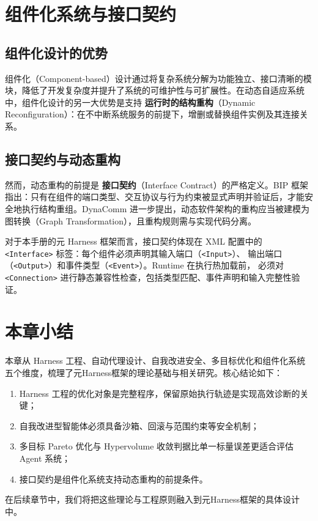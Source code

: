 \section{组件化系统与接口契约}

\subsection{组件化设计的优势}

组件化（Component-based）设计通过将复杂系统分解为功能独立、接口清晰的模块，降低了开发复杂度并提升了系统的可维护性与可扩展性。在动态自适应系统中，组件化设计的另一大优势是支持 \textbf{运行时的结构重构}（Dynamic Reconfiguration）：在不中断系统服务的前提下，增删或替换组件实例及其连接关系。

\subsection{接口契约与动态重构}

然而，动态重构的前提是 \textbf{接口契约}（Interface Contract）的严格定义。BIP 框架 \cite{bip2011} 指出：只有在组件的端口类型、交互协议与行为约束被显式声明并验证后，才能安全地执行结构重组。DynaComm \cite{dynacomm2007} 进一步提出，动态软件架构的重构应当被建模为图转换（Graph Transformation），且重构规则需与实现代码分离。

对于本手册的元 Harness 框架而言，接口契约体现在 XML 配置中的
\texttt{<Interface>} 标签：每个组件必须声明其输入端口（\texttt{<Input>}）、
输出端口（\texttt{<Output>}）和事件类型（\texttt{<Event>}）。Runtime 在执行热加载前，
必须对 \texttt{<Connection>} 进行静态兼容性检查，包括类型匹配、事件声明和输入完整性验证。

\section{本章小结}

本章从 Harness 工程、自动代理设计、自我改进安全、多目标优化和组件化系统五个维度，梳理了元Harness框架的理论基础与相关研究。核心结论如下：
\begin{enumerate}
    \item Harness 工程的优化对象是完整程序，保留原始执行轨迹是实现高效诊断的关键；
    \item 自我改进型智能体必须具备沙箱、回滚与范围约束等安全机制；
    \item 多目标 Pareto 优化与 Hypervolume 收敛判据比单一标量误差更适合评估 Agent 系统；
    \item 接口契约是组件化系统支持动态重构的前提条件。
\end{enumerate}

在后续章节中，我们将把这些理论与工程原则融入到元Harness框架的具体设计中。
